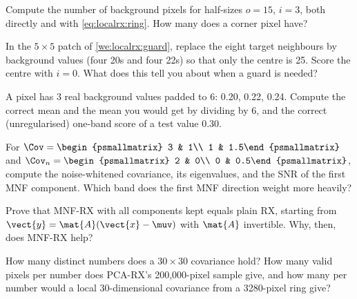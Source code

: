 \begin{checkyourself}
\item\label{ex:localrx:1} Compute the number of background pixels for half-sizes $o = 15$, $i = 3$, both
  directly and with \cref{eq:localrx:ring}. How many does a corner pixel have?
\item\label{ex:localrx:2} In the $5\times5$ patch of \cref{we:localrx:guard}, replace the eight target
  neighbours by background values (four 20s and four 22s) so that only the centre is 25. Score the
  centre with $i = 0$. What does this tell you about when a guard is needed?
\item\label{ex:localrx:3} A pixel has 3 real background values padded to 6: 0.20, 0.22, 0.24. Compute the
  correct mean and the mean you would get by dividing by 6, and the correct (unregularised) one-band
  score of a test value 0.30.
\item\label{ex:localrx:4} For $\Cov = \begin{psmallmatrix} 3 & 1\\ 1 & 1.5\end{psmallmatrix}$ and
  $\Cov_n = \begin{psmallmatrix} 2 & 0\\ 0 & 0.5\end{psmallmatrix}$, compute the noise-whitened covariance,
  its eigenvalues, and the SNR of the first MNF component. Which band does the first MNF direction weight
  more heavily?
\item\label{ex:localrx:5} Prove that MNF-RX with all components kept equals plain RX, starting from
  $\vect{y} = \mat{A}(\vect{x} - \muv)$ with $\mat{A}$ invertible. Why, then, does MNF-RX help?
\item\label{ex:localrx:6} How many distinct numbers does a $30\times30$ covariance hold? How many valid
  pixels per number does PCA-RX's 200,000-pixel sample give, and how many per number would a local
  $30$-dimensional covariance from a 3280-pixel ring give?
\end{checkyourself}

